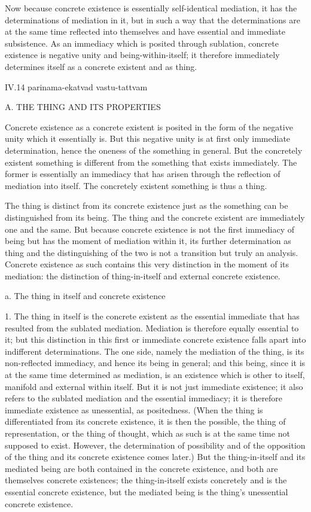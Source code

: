 Now because concrete existence is
essentially self-identical mediation,
it has the determinations of mediation in it,
but in such a way that the determinations are
at the same time reflected into themselves
and have essential and immediate subsistence.
As an immediacy which is posited through sublation,
concrete existence is negative unity and being-within-itself;
it therefore immediately determines itself
as a concrete existent and as thing.

IV.14
parinama-ekatvad vastu-tattvam

A. THE THING AND ITS PROPERTIES

Concrete existence as a concrete existent is posited in
the form of the negative unity which it essentially is.
But this negative unity is at first only immediate determination,
hence the oneness of the something in general.
But the concretely existent something is different
from the something that exists immediately.
The former is essentially an immediacy that has arisen
through the reflection of mediation into itself.
The concretely existent something is thus a thing.

The thing is distinct from its concrete existence
just as the something can be distinguished from its being.
The thing and the concrete existent
are immediately one and the same.
But because concrete existence is not
the first immediacy of being
but has the moment of mediation within it,
its further determination as thing
and the distinguishing of the two is
not a transition but truly an analysis.
Concrete existence as such contains
this very distinction in the moment of its mediation:
the distinction of thing-in-itself
and external concrete existence.

a. The thing in itself and concrete existence

1. The thing in itself is the concrete existent
as the essential immediate that has resulted
from the sublated mediation.
Mediation is therefore equally essential to it;
but this distinction in this first
or immediate concrete existence
falls apart into indifferent determinations.
The one side, namely the mediation of the thing,
is its non-reflected immediacy,
and hence its being in general;
and this being, since it is
at the same time determined as mediation,
is an existence which is other to itself,
manifold and external within itself.
But it is not just immediate existence;
it also refers to the sublated mediation
and the essential immediacy;
it is therefore immediate existence
as unessential, as positedness.
(When the thing is differentiated
from its concrete existence,
it is then the possible,
the thing of representation,
or the thing of thought,
which as such is at the same time
not supposed to exist.
However, the determination of possibility
and of the opposition of the thing
and its concrete existence comes later.)
But the thing-in-itself and its mediated being are
both contained in the concrete existence,
and both are themselves concrete existences;
the thing-in-itself exists concretely
and is the essential concrete existence,
but the mediated being is
the thing's unessential concrete existence.

